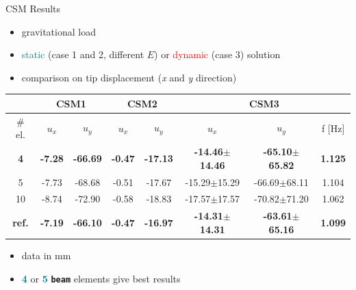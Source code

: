 \documentclass[10pt,t]{beamer}
\begin{document}
\begin{frame}{CSM Results}

\begin{itemize}
    \item gravitational load
    \item \textcolor{teal}{static} (case 1 and 2, different $E$) or \textcolor{red}{dynamic} (case 3) solution
    \item comparison on \textcolor{dblue}{tip displacement} (\textit{x} and \textit{y} direction)
\end{itemize}
    
\pause

\vspace{0.5cm}
    
\begin{table}[h!]
\footnotesize
\label{tab:csm}
\begin{center}
\begin{tabular}{ c | c c | c c | c c c }
 & \multicolumn{2}{c|}{CSM1} & \multicolumn{2}{c|}{CSM2} & \multicolumn{3}{c}{CSM3} \\
\hline
\# el. & $u_x$ & $u_y$  & $u_x$ & $u_y$ & $u_x$ & $u_y$  & f  [\si{Hz}]\\
\hline
\cellcolor{green!10}\textbf{4} & \cellcolor{green!10}\textbf{-7.28}    &  \cellcolor{green!10}\textbf{-66.69} & \cellcolor{green!10}\textbf{-0.47} & \cellcolor{green!10}\textbf{-17.13} &  \cellcolor{green!10}\textbf{-14.46}$\pm$\textbf{14.46} & \cellcolor{green!10}\textbf{-65.10}$\pm$\textbf{65.82} & \cellcolor{green!10}\textbf{1.125}  \\
\hline
5 & -7.73    &  -68.68 & -0.51 & -17.67 &  -15.29$\pm$15.29 & -66.69$\pm$68.11 & 1.104 \\
\hline
10 & -8.74    &  -72.90 & -0.58 & -18.83 &  -17.57$\pm$17.57 & -70.82$\pm$71.20 & 1.062 \\
\hline
\hline
\textbf{ref.}  &  \textbf{-7.19} & \textbf{-66.10} & \textbf{-0.47} & \textbf{-16.97} & \textbf{-14.31}$\pm$\textbf{14.31} & \textbf{-63.61}$\pm$\textbf{65.16} & \textbf{1.099} \\
\hline
\end{tabular}
\end{center}
\end{table}

\vspace{0.5cm}

\begin{itemize}
    \item data in \si{mm}
    \item \textcolor{teal}{\textbf{4}} or \textcolor{teal}{\textbf{5}} \textcolor{dorange}{\textbf{\texttt{beam}}} elements give best results
\end{itemize}


\end{frame}
\end{document}
